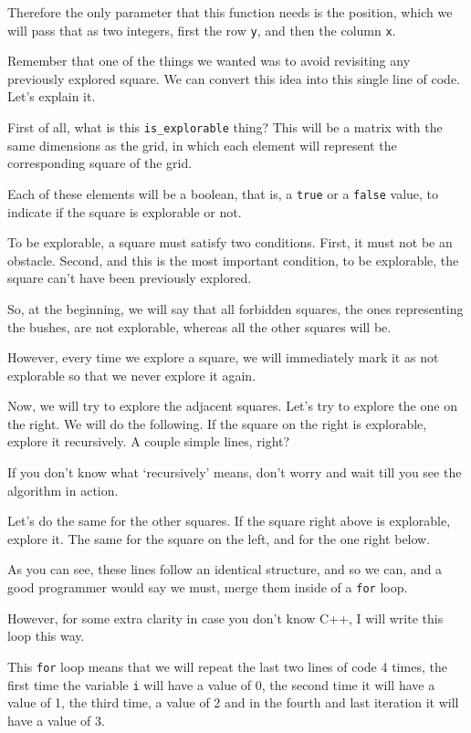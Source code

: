 \documentclass[12pt]{article}
\renewcommand{\v}[1]{\texttt{#1}}
\begin{document}
Therefore
the only parameter that this function needs is the position,
which we will pass that as two integers,
first the row \v{y}, and then the column \v{x}.

Remember that one of the things we wanted was to avoid revisiting
any previously explored square.
We can convert this idea into this single
line of code. Let's explain it.

First of all, what is this \verb|is_explorable| thing?
This will be a matrix with the same dimensions as the grid,
in which each element will represent the corresponding square
of the grid.

Each of these elements will be a boolean,
that is, a \v{true} or a \v{false}
value, to indicate if the square is explorable or not.

To be explorable, a square must satisfy two conditions.
First, it must not be an obstacle. Second, and this
is the most important condition,
to be explorable, the square can't have been previously
explored.

So, at the beginning, we will say that all forbidden squares,
the ones representing the bushes, are not explorable,
whereas all the other squares will be.

However, every time
we explore a square, we will immediately mark it as not explorable
so that we never explore it again.

Now, we will try to explore the adjacent squares.
Let's try to explore the one on the right.
We will do the following. If the square on the right is
explorable, explore it recursively. A couple simple lines, right?

If you don't know what 
`recursively' means, don't worry and wait till you see the
algorithm in action.

Let's do the same for the other squares.
If the square right above
is explorable, explore it. The same for the
square on the left, and for the one right below.

As you can see, these lines follow an identical structure,
and so we can,
and a good programmer would say we must,
merge them inside of a \v{for} loop.

However, for some extra clarity
in case you don't know C++, I will write this loop this way.

This \v{for} loop means that we will repeat the last two
lines
of code 4 times, the first time the variable \v{i} will have
a value of 0, the second time it will have a value of 1,
the third time, a value of 2 and in the 
fourth and last iteration it will have a value of 3.
\end{document}

